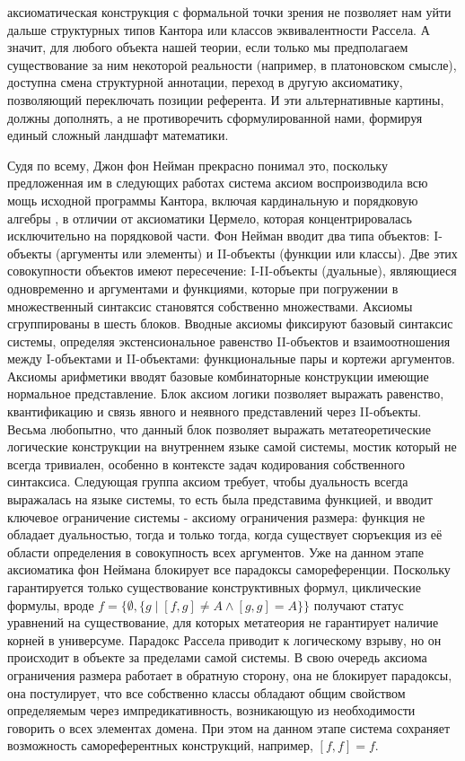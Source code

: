 \documentclass[12pt]{article}
\begin{document}
аксиоматическая конструкция с формальной точки зрения не позволяет нам уйти дальше структурных типов Кантора или классов эквивалентности Рассела. А значит, для любого объекта нашей теории, если только мы предполагаем существование за ним некоторой реальности (например, в платоновском смысле), доступна смена структурной аннотации, переход в другую аксиоматику, позволяющий переключать позиции референта. И эти альтернативные картины, должны дополнять, а не противоречить сформулированной нами, формируя единый сложный ландшафт математики.

Судя по всему, Джон фон Нейман прекрасно понимал это, поскольку предложенная им в следующих работах система аксиом воспроизводила всю мощь исходной программы Кантора, включая кардинальную и порядковую алгебры \cite{von-neumann-system}, в отличии от аксиоматики Цермело, которая концентрировалась исключительно на порядковой части. Фон Нейман вводит два типа объектов: I-объекты (аргументы или элементы) и II-объекты (функции или классы). Две этих совокупности объектов имеют пересечение: I-II-объекты (дуальные), являющиеся одновременно и аргументами и функциями, которые при погружении в множественный синтаксис становятся собственно множествами. Аксиомы сгруппированы в шесть блоков. Вводные аксиомы фиксируют базовый синтаксис системы, определяя экстенсиональное равенство II-объектов и взаимоотношения между I-объектами и II-объектами: функциональные пары и кортежи аргументов. Аксиомы арифметики вводят базовые комбинаторные конструкции имеющие нормальное представление. Блок аксиом логики позволяет выражать равенство, квантификацию и связь явного и неявного представлений через II-объекты. Весьма любопытно, что данный блок позволяет выражать метатеоретические логические конструкции на внутреннем языке самой системы, мостик который не всегда тривиален, особенно в контексте задач кодирования собственного синтаксиса. Следующая группа аксиом требует, чтобы дуальность всегда выражалась на языке системы, то есть была представима функцией, и вводит ключевое ограничение системы - аксиому ограничения размера: функция не обладает дуальностью, тогда и только тогда, когда существует сюръекция из её области определения в совокупность всех аргументов. Уже на данном этапе аксиоматика фон Неймана блокирует все парадоксы самореференции. Поскольку гарантируется только существование конструктивных формул, циклические формулы, вроде $f = \{ \emptyset, \{ g \mid [f, g] \neq A \wedge [g, g] = A \} \}$ получают статус уравнений на существование, для которых метатеория не гарантирует наличие корней в универсуме. Парадокс Рассела приводит к логическому взрыву, но он происходит в объекте за пределами самой системы. В свою очередь аксиома ограничения размера работает в обратную сторону, она не блокирует парадоксы, она постулирует, что все собственно классы обладают общим свойством определяемым через импредикативность, возникающую из необходимости говорить о всех элементах домена. При этом на данном этапе система сохраняет возможность самореферентных конструкций, например, $[f, f] = f$.
\end{document}
